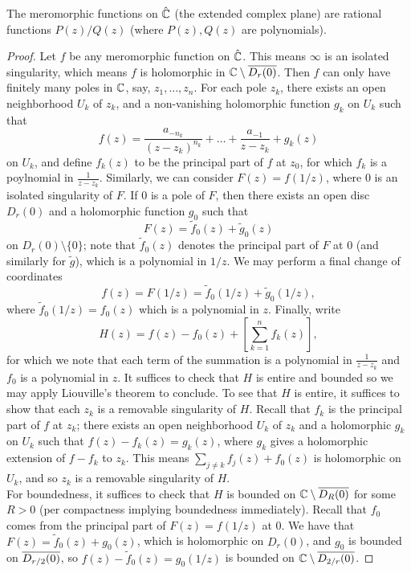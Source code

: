 \begin{theorem}[\S 3.3.4]
    The meromorphic functions on $\hat {\mathbb C}$ (the extended complex plane) are rational functions $P(z)/Q(z)$ (where $P(z), Q(z)$ are polynomials).
\end{theorem}
\begin{proof}
    Let $f$ be any meromorphic function on $\hat {\mathbb C}$. This means $\infty$ is an isolated singularity, which means $f$ is holomorphic in $\mathbb C \setminus \overline{D_r(0)}$. Then $f$ can only have finitely many poles in $\mathbb C$, say, $z_1, \dots, z_n$. For each pole $z_k$, there exists an open neighborhood $U_k$ of $z_k$, and a non-vanishing holomorphic function $g_k$ on $U_k$ such that
    \[ f(z) = \frac{a_{-n_k}}{(z - z_k)^{n_k}} + \dots + \frac{a_{-1}}{z - z_k} + g_k(z) \]
    on $U_k$, and define $f_k(z)$ to be the principal part of $f$ at $z_0$, for which $f_k$ is a poylnomial in $\frac{1}{z - z_k}$. Similarly, we can consider $F(z) = f(1/z)$, where $0$ is an isolated singularity of $F$. If $0$ is a pole of $F$, then there exists an open disc $D_r(0)$ and a holomorphic function $g_0$ such that
    \[ F(z) = \tilde{f}_0(z) + \tilde{g}_0(z) \]
    on $D_r(0) \setminus \{0\}$; note that $\tilde{f}_0(z)$ denotes the principal part of $F$ at $0$ (and similarly for $\tilde{g}$), which is a polynomial in $1/z$. We may perform a final change of coordinates
    \[ f(z) = F(1/z) = \tilde{f}_0(1/z) + \tilde{g}_0(1/z), \]
    where $\tilde{f}_0(1/z) = f_0(z)$ which is a polynomial in $z$. Finally, write
    \[ H(z) = f(z) - f_0(z) + \left[\sum_{k=1}^n f_k(z)\right], \]
    for which we note that each term of the summation is a polynomial in $\frac{1}{z-z_k}$ and $f_0$ is a polynomial in $z$. It suffices to check that $H$ is entire and bounded so we may apply Liouville's theorem to conclude. To see that $H$ is entire, it suffices to show that each $z_k$ is a removable singularity of $H$. Recall that $f_k$ is the principal part of $f$ at $z_k$; there exists an open neighborhood $U_k$ of $z_k$ and a holomorphic $g_k$ on $U_k$ such that $f(z) - f_k(z) = g_k(z)$, where $g_k$ gives a holomorphic extension of $f - f_k$ to $z_k$. This means $\sum_{j \neq k} f_j(z) + f_0(z)$ is holomorphic on $U_k$, and so $z_k$ is a removable singularity of $H$.
    \\[8pt]
    For boundedness, it suffices to check that $H$ is bounded on $\mathbb C \setminus \overline{D_R(0)}$ for some $R > 0$ (per compactness implying boundedness immediately). Recall that $f_0$ comes from the principal part of $F(z) = f(1/z)$ at $0$. We have that $F(z) = \tilde{f}_0(z) + g_0(z)$, which is holomorphic on $D_r(0)$, and $g_0$ is bounded on $\overline{D_{r/2}(0)}$, so $f(z) - \tilde{f}_0(z) = g_0(1/z)$ is bounded on $\mathbb C \setminus \overline{D_{2/r}(0)}$.
\end{proof}